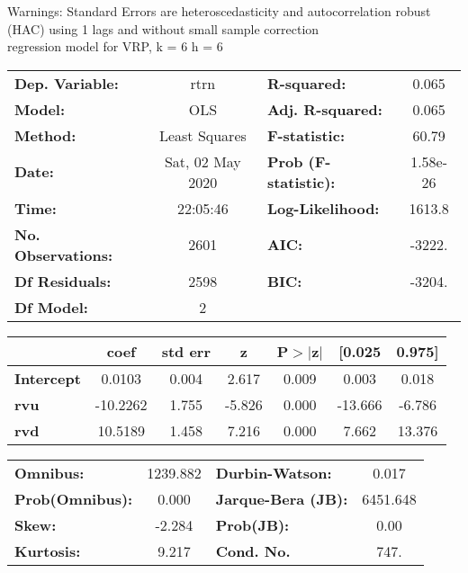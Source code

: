 Warnings: \newline
 [1] Standard Errors are heteroscedasticity and autocorrelation robust (HAC) using 1 lags and without small sample correction\\ 

regression model for VRP, k = 6 h = 6\begin{center}
\begin{tabular}{lclc}
\toprule
\textbf{Dep. Variable:}    &       rtrn       & \textbf{  R-squared:         } &     0.065   \\
\textbf{Model:}            &       OLS        & \textbf{  Adj. R-squared:    } &     0.065   \\
\textbf{Method:}           &  Least Squares   & \textbf{  F-statistic:       } &     60.79   \\
\textbf{Date:}             & Sat, 02 May 2020 & \textbf{  Prob (F-statistic):} &  1.58e-26   \\
\textbf{Time:}             &     22:05:46     & \textbf{  Log-Likelihood:    } &    1613.8   \\
\textbf{No. Observations:} &        2601      & \textbf{  AIC:               } &    -3222.   \\
\textbf{Df Residuals:}     &        2598      & \textbf{  BIC:               } &    -3204.   \\
\textbf{Df Model:}         &           2      & \textbf{                     } &             \\
\bottomrule
\end{tabular}
\begin{tabular}{lcccccc}
                   & \textbf{coef} & \textbf{std err} & \textbf{z} & \textbf{P$> |$z$|$} & \textbf{[0.025} & \textbf{0.975]}  \\
\midrule
\textbf{Intercept} &       0.0103  &        0.004     &     2.617  &         0.009        &        0.003    &        0.018     \\
\textbf{rvu}       &     -10.2262  &        1.755     &    -5.826  &         0.000        &      -13.666    &       -6.786     \\
\textbf{rvd}       &      10.5189  &        1.458     &     7.216  &         0.000        &        7.662    &       13.376     \\
\bottomrule
\end{tabular}
\begin{tabular}{lclc}
\textbf{Omnibus:}       & 1239.882 & \textbf{  Durbin-Watson:     } &    0.017  \\
\textbf{Prob(Omnibus):} &   0.000  & \textbf{  Jarque-Bera (JB):  } & 6451.648  \\
\textbf{Skew:}          &  -2.284  & \textbf{  Prob(JB):          } &     0.00  \\
\textbf{Kurtosis:}      &   9.217  & \textbf{  Cond. No.          } &     747.  \\
\bottomrule
\end{tabular}
\end{center}

